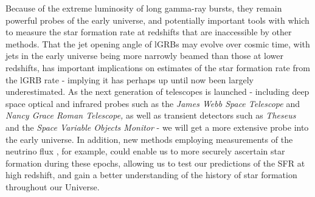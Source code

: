 \documentclass[fleqn,usenatbib,useAMS]{mnras}
\begin{document}
  Because of the extreme luminosity of long gamma-ray bursts, they remain powerful probes of the early universe, and potentially important tools with which to measure the star formation rate at redshifts that are inaccessible by other methods.  That the jet opening angle of lGRBs may evolve over cosmic time, with jets in the early universe being more narrowly beamed than those at lower redshifts, has important implications on estimates of the star formation rate from the lGRB rate - implying it has perhaps up until now been largely underestimated.  As the next generation of telescopes is launched - including deep space optical and infrared probes such as the {\em James Webb Space Telescope} and  {\em Nancy Grace Roman Telescope,} as well as transient detectors such as {\em Theseus} and the {\em Space Variable Objects Monitor} - we will get a more extensive probe into the early universe.  In addition, new methods employing measurements of the neutrino flux \citep{Riya20}, for example, could enable us to more securely ascertain star formation during these epochs, allowing us to test our predictions of the SFR at high redshift, and gain a better understanding of the history of star formation throughout our Universe.\\
  
 
 
\end{document}

